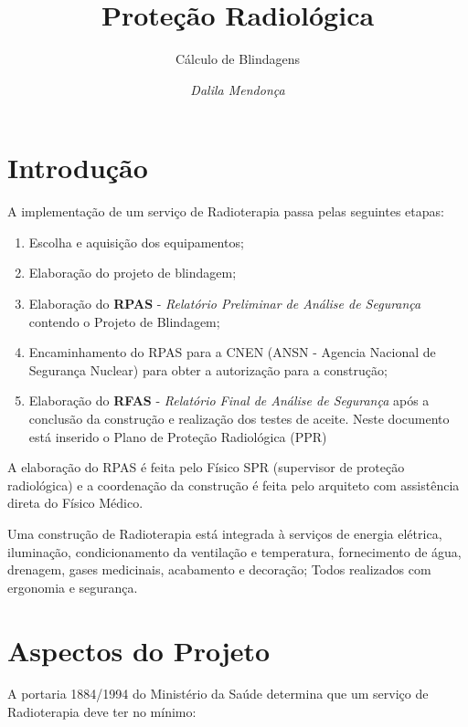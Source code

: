 \documentclass[11pt,a4paper]{article}
\title{Proteção Radiológica}
\author{Cálculo de Blindagens\nocite{*}}
\date{\textit{Dalila Mendonça}}
\begin{document}
	\maketitle

    \section{Introdução}

    A implementação de um serviço de Radioterapia passa pelas seguintes etapas:

    \begin{enumerate}
        \item Escolha e aquisição dos equipamentos;
        \item Elaboração do projeto de blindagem;
        \item Elaboração do \textcolor{CarnationPink}{\textbf{RPAS} - \textit{Relatório Preliminar de Análise de Segurança}} contendo o Projeto de Blindagem;
        \item Encaminhamento do RPAS para a CNEN (ANSN - Agencia Nacional de Segurança Nuclear) para obter a autorização para a construção;
        \item  Elaboração do \textcolor{CarnationPink}{\textbf{RFAS} - \textit{Relatório Final de Análise de Segurança}} após a conclusão da construção e realização dos testes de aceite. Neste documento está inserido o Plano de Proteção Radiológica (PPR)
    \end{enumerate}

    A elaboração do RPAS é feita pelo Físico SPR (supervisor de proteção radiológica) e a coordenação da construção é feita pelo arquiteto com assistência direta do Físico Médico.

    Uma construção de Radioterapia está integrada à serviços de energia elétrica, iluminação, condicionamento da ventilação e temperatura, fornecimento de água, drenagem, gases medicinais, acabamento e decoração; Todos realizados com ergonomia e segurança.

    \section{Aspectos do Projeto}

        A portaria 1884/1994 do Ministério da Saúde determina que um serviço de Radioterapia deve ter no mínimo:
\end{document}

